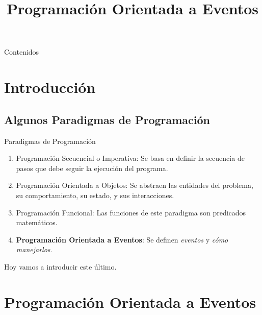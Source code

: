 


\title%
{Programaci\'on Orientada a Eventos}

\subject{Programaci\'on Orientada a Eventos}



\begin{frame}
   \titlepage
\end{frame}

\begin{frame}{Contenidos}
  \tableofcontents
\end{frame}


\section{Introducci\'on}


\subsection{Algunos Paradigmas de Programaci\'on}

\begin{frame}{Paradigmas de Programaci\'on}{}
  \begin{enumerate}

    \item Programaci\'on Secuencial o Imperativa: Se basa en definir la secuencia de pasos que debe seguir la ejecuci\'on del programa.

    \item Programaci\'on Orientada a Objetos: Se abstraen las entidades del problema, su comportamiento, su estado, y sus interacciones.

    \item Programaci\'on Funcional: Las funciones de este paradigma son predicados matem\'aticos.

    \item \textbf{Programaci\'on Orientada a Eventos}: Se definen \textit{eventos} y \textit{c\'omo manejarlos}.

  \end{enumerate}

  Hoy vamos a introducir este \'ultimo.
\end{frame}


\section{Programaci\'on Orientada a Eventos}



